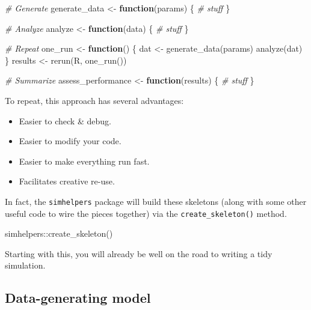 \documentclass[
]{book}
\newenvironment{Shaded}{\begin{snugshade}}{\end{snugshade}}
\newcommand{\CommentTok}[1]{\textcolor[rgb]{0.56,0.35,0.01}{\textit{#1}}}
\newcommand{\ControlFlowTok}[1]{\textcolor[rgb]{0.13,0.29,0.53}{\textbf{#1}}}
\newcommand{\FunctionTok}[1]{\textcolor[rgb]{0.00,0.00,0.00}{#1}}
\newcommand{\NormalTok}[1]{#1}
\newcommand{\OtherTok}[1]{\textcolor[rgb]{0.56,0.35,0.01}{#1}}
\newcommand{\SpecialCharTok}[1]{\textcolor[rgb]{0.00,0.00,0.00}{#1}}
\begin{document}
\begin{Shaded}
\begin{Highlighting}[]
\CommentTok{\# Generate}
\NormalTok{generate\_data }\OtherTok{\textless{}{-}} \ControlFlowTok{function}\NormalTok{(params) \{}
  \CommentTok{\# stuff}
\NormalTok{\}}

\CommentTok{\# Analyze}
\NormalTok{analyze }\OtherTok{\textless{}{-}} \ControlFlowTok{function}\NormalTok{(data) \{}
  \CommentTok{\# stuff}
\NormalTok{\}}

\CommentTok{\# Repeat}
\NormalTok{one\_run }\OtherTok{\textless{}{-}} \ControlFlowTok{function}\NormalTok{() \{}
\NormalTok{  dat }\OtherTok{\textless{}{-}} \FunctionTok{generate\_data}\NormalTok{(params)}
  \FunctionTok{analyze}\NormalTok{(dat)}
\NormalTok{\}}
\NormalTok{results }\OtherTok{\textless{}{-}} \FunctionTok{rerun}\NormalTok{(R, }\FunctionTok{one\_run}\NormalTok{())}

\CommentTok{\# Summarize}
\NormalTok{assess\_performance }\OtherTok{\textless{}{-}} \ControlFlowTok{function}\NormalTok{(results) \{}
  \CommentTok{\# stuff}
\NormalTok{\}}
\end{Highlighting}
\end{Shaded}

To repeat, this approach has several advantages:

\begin{itemize}
\item
  Easier to check \& debug.
\item
  Easier to modify your code.
\item
  Easier to make everything run fast.
\item
  Facilitates creative re-use.
\end{itemize}

In fact, the \texttt{simhelpers} package will build these skeletons (along with some other useful code to wire the pieces together) via the \texttt{create\_skeleton()} method.

\begin{Shaded}
\begin{Highlighting}[]
\NormalTok{simhelpers}\SpecialCharTok{::}\FunctionTok{create\_skeleton}\NormalTok{()}
\end{Highlighting}
\end{Shaded}

Starting with this, you will already be well on the road to writing a tidy simulation.

\hypertarget{data-generating-model}{%
\subsection{Data-generating model}\label{data-generating-model}}
\end{document}
